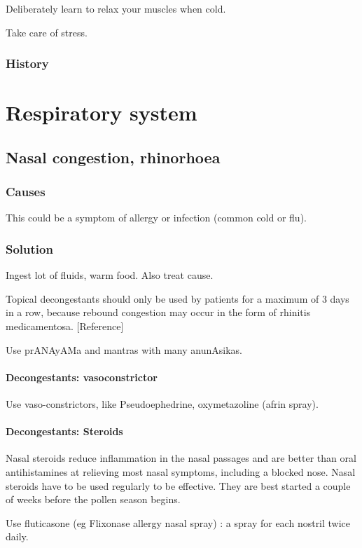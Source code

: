 \documentclass[oneside, article]{memoir}
\begin{document}
Deliberately learn to relax your muscles when cold.

Take care of stress.

\subsection{History}


\chapter{Respiratory system}
\section{Nasal congestion, rhinorhoea}
\subsection{Causes}
This could be a symptom of allergy or infection (common cold or flu).

\subsection{Solution}
Ingest lot of fluids, warm food. Also treat cause.

Topical decongestants should only be used by patients for a maximum of 3 days in a row, because rebound congestion may occur in the form of rhinitis medicamentosa. [Reference]

Use prANAyAMa and mantras with many anunAsikas.

\subsubsection{Decongestants: vasoconstrictor}
Use vaso-constrictors, like Pseudoephedrine, oxymetazoline (afrin spray).

\subsubsection{Decongestants: Steroids}
Nasal steroids reduce inflammation in the nasal passages and are better than oral antihistamines at relieving most nasal symptoms, including a blocked nose. Nasal steroids have to be used regularly to be effective. They are best started a couple of weeks before the pollen season begins.

Use fluticasone (eg Flixonase allergy nasal spray) : a spray for each nostril twice daily.
\end{document}
